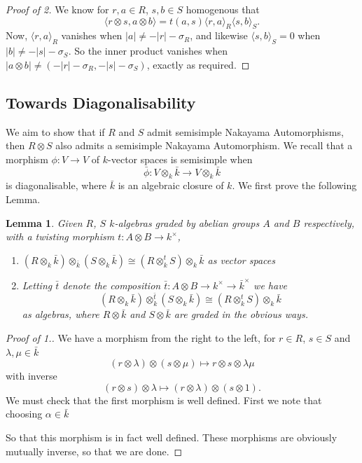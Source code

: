 \documentclass{article}
\theoremstyle{plain}
\newtheorem{lemma}[theorem]{Lemma}
\theoremstyle{definition}
\begin{document}
\begin{proof}[Proof of 2]
We know for $r, a \in R$, $s, b \in S$ homogenous that 
$$\langle r \otimes s, a \otimes b \rangle = t(a,s)\langle r, a \rangle_R \langle s, b \rangle_S.$$
Now, $\langle r, a \rangle_R$ vanishes when $|a| \not = -|r|-\sigma_R$, and likewise $\langle s, b \rangle_S=0$ when $|b|\not=-|s|-\sigma_S$. So the inner product vanishes when $| a\otimes b| \not = (-|r| - \sigma_R, -|s| - \sigma_S)$, exactly as required.
\end{proof}
\subsection{Towards Diagonalisability}
We aim to show that if $R$ and $S$ admit semisimple Nakayama Automorphisms, then $R \otimes S$ also admits a semisimple Nakayama Automorphism. We recall that a morphism $\phi: V \rightarrow V$ of $k$-vector spaces is semisimple when
$$\bar{\phi}: V \otimes_k \bar{k} \rightarrow V \otimes_k \bar{k}$$ is diagonalisable, where $\bar{k}$ is an algebraic closure of $k$. We first prove the following Lemma.
\begin{lemma} Given $R$, $S$ $k$-algebras graded by abelian groups $A$ and $B$ respectively, with a twisting morphism $t: A \otimes B \rightarrow k^\times$,
\begin{enumerate}
\item $(R \otimes_k \bar{k}) \otimes_{\bar{k}} (S \otimes_k \bar{k}) \cong (R \otimes_k^t S) \otimes_k \bar{k}$  as vector spaces
\item Letting $\bar{t}$ denote the composition $\bar{t}: A\otimes B \rightarrow k^\times \rightarrow \bar{k}^\times$ we have
$$( R \otimes_k \bar{k}) \otimes^{\bar{t}}_k (S \otimes_k \bar{k}) \cong (R \otimes^t_k S)\otimes_k \bar{k}$$
as algebras, where $R\otimes \bar{k}$ and $S \otimes \bar{k}$ are graded in the obvious ways.
\end{enumerate}
\end{lemma}
\begin{proof}[Proof of 1.]

We have a morphism from the right to the left, for $r \in R$, $s\in S$ and $\lambda, \mu \in \bar{k}$
$$ (r \otimes \lambda) \otimes (s \otimes \mu) \mapsto r \otimes s \otimes \lambda\mu$$
with inverse
$$(r \otimes s )\otimes \lambda  \mapsto (r \otimes \lambda) \otimes (s \otimes 1).$$
We must check that the first morphism is well defined. First we note that choosing $\alpha \in \bar{k}$
\begin{center}
 \end{center}
So that this morphism is in fact well defined. These morphisms are obviously mutually inverse, so that we are done. 
\end{proof}
\end{document}
